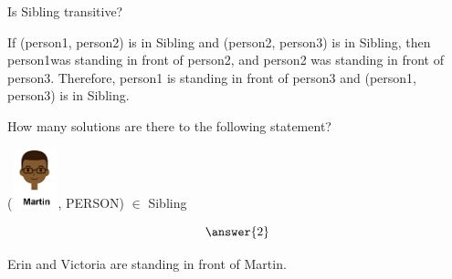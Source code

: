 \documentclass{ximera}
\begin{document}
\begin{exercise}
Is Sibling transitive?

  \begin{multipleChoice}
  \end{multipleChoice}
  \begin{feedback}
If (person1, person2) is in Sibling and (person2, person3) is in Sibling, then person1was standing in front of person2, and person2 was standing in front of person3. Therefore, person1 is standing in front of person3 and (person1, person3) is in Sibling.
  \end{feedback}
\end{exercise}




\begin{exercise}
How many solutions are there to the following statement?  

({\includegraphics[width=50px,height=65px]{pics/people/martin.png}}, PERSON) $\in$ Sibling 

\[  \answer{2} \]

  \begin{feedback}
Erin and Victoria are standing in front of Martin.
  \end{feedback}
\end{exercise}
\end{document}

